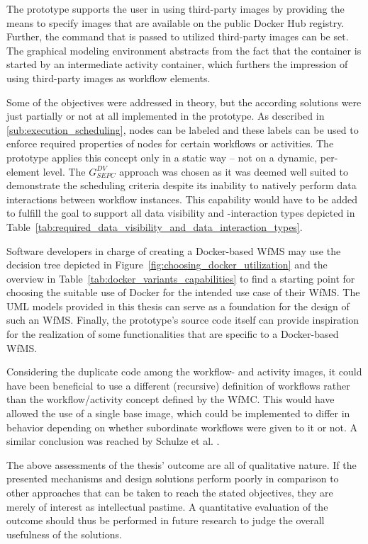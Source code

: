   The prototype supports the user in using third-party images by providing the means to specify images that are available on the public Docker Hub registry. Further, the command that is passed to utilized third-party images can be set. The graphical modeling environment abstracts from the fact that the container is started by an intermediate activity container, which furthers the impression of using third-party images as workflow elements.

  Some of the objectives were addressed in theory, but the according solutions were just partially or not at all implemented in the prototype.
  As described in \ref{sub:execution_scheduling}, nodes can be labeled and these labels can be used to enforce required properties of nodes for certain workflows or activities.
  The prototype applies this concept only in a static way -- not on a dynamic, per-element level.
  The $G_{SEPC}^{DV}$ approach was chosen as it was deemed well suited to demonstrate the scheduling criteria despite its inability to natively perform data interactions between workflow instances. This capability would have to be added to fulfill the goal to support all data visibility and -interaction types depicted in Table~\ref{tab:required_data_visibility_and_data_interaction_types}.

  Software developers in charge of creating a Docker-based \ac{WfMS} may use the decision tree depicted in Figure~\ref{fig:choosing_docker_utilization} and the overview in Table~\ref{tab:docker_variants_capabilities} to find a starting point for choosing the suitable use of Docker for the intended use case of their \ac{WfMS}. The UML models provided in this thesis can serve as a foundation for the design of such an \ac{WfMS}. Finally, the prototype's source code itself can provide inspiration for the realization of some functionalities that are specific to a Docker-based \ac{WfMS}.

  Considering the duplicate code among the workflow- and activity images, it could have been beneficial to use a different (recursive) definition of workflows rather than the workflow/activity concept defined by the \ac{WfMC}. This would have allowed the use of a single base image, which could be implemented to differ in behavior depending on whether subordinate workflows were given to it or not. A similar conclusion was reached by Schulze et al. \cite[p.~119]{Schulze1998Services}.

  The above assessments of the thesis' outcome are all of qualitative nature. If the presented mechanisms and design solutions perform poorly in comparison to other approaches that can be taken to reach the stated objectives, they are merely of interest as intellectual pastime. A quantitative evaluation of the outcome should thus be performed in future research to judge the overall usefulness of the solutions.


